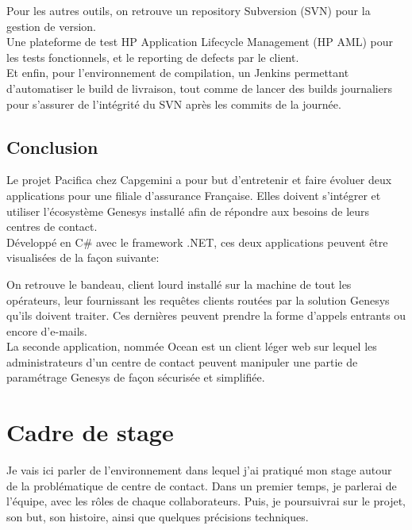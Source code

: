 \documentclass{rapport}
\begin{document}
Pour les autres outils, on retrouve un repository Subversion (SVN) pour la gestion de version.\\
Une plateforme de test HP Application Lifecycle Management (HP AML) pour les tests fonctionnels, et le reporting de defects par le client.\\
Et enfin, pour l'environnement de compilation, un Jenkins permettant d'automatiser le build de livraison, tout comme de lancer des builds journaliers pour s'assurer de l'intégrité du SVN après les commits de la journée.

\subsection*{Conclusion}

Le projet Pacifica chez Capgemini a pour but d'entretenir et faire évoluer deux applications pour une filiale d'assurance Française. Elles doivent s'intégrer et utiliser l'écosystème Genesys installé  afin de répondre aux besoins de leurs centres de contact.\\

Développé en C\# avec le framework .NET, ces deux applications peuvent être visualisées de la façon suivante:


On retrouve le bandeau, client lourd installé sur la machine de tout les opérateurs, leur fournissant les requêtes clients routées par la solution Genesys qu'ils doivent traiter. Ces dernières peuvent prendre la forme d'appels entrants ou encore d'e-mails.\\

La seconde application, nommée Ocean est un client léger web sur lequel les administrateurs d'un centre de contact peuvent manipuler une partie de paramétrage Genesys de façon sécurisée et simplifiée.

\newpage

\section{Cadre de stage}

Je vais ici parler de l'environnement dans lequel j'ai pratiqué mon stage autour de la problématique de centre de contact.
Dans un premier temps, je parlerai de l'équipe, avec les rôles de chaque collaborateurs. Puis, je poursuivrai sur le projet, son but, son histoire, ainsi que quelques précisions techniques.
\end{document}
